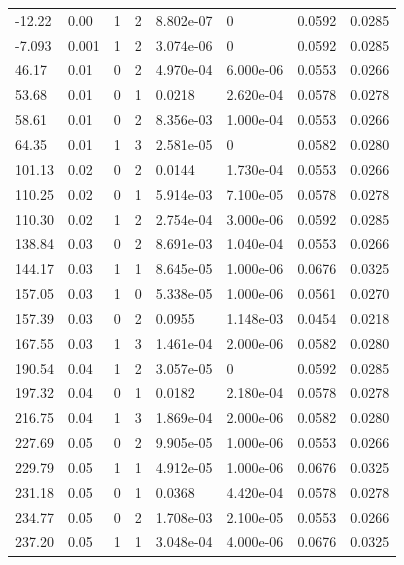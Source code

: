 \documentclass[preview]{standalone}
\begin{document}
{{\begin{tabular}{L{1.2cm}C{1.2cm} C{0.3cm}C{0.5cm} C{1.4cm}C{1.4cm} C{1.4cm}C{1.4cm}}
  -12.22  &  0.00  & 1     &  2 &  8.802e-07  & 0  & 0.0592 &  0.0285   \\ 
  -7.093  &  0.001  & 1     &  2 &  3.074e-06  & 0  & 0.0592 &  0.0285   \\ 
  46.17  &  0.01  & 0     &  2 &  4.970e-04  & 6.000e-06  & 0.0553 &  0.0266   \\ 
  53.68  &  0.01  & 0     &  1 &  0.0218  & 2.620e-04  & 0.0578 &  0.0278   \\ 
  58.61  &  0.01  & 0     &  2 &  8.356e-03  & 1.000e-04  & 0.0553 &  0.0266   \\ 
  64.35  &  0.01  & 1     &  3 &  2.581e-05  & 0  & 0.0582 &  0.0280   \\ 
  101.13  &  0.02  & 0     &  2 &  0.0144  & 1.730e-04  & 0.0553 &  0.0266   \\ 
  110.25  &  0.02  & 0     &  1 &  5.914e-03  & 7.100e-05  & 0.0578 &  0.0278   \\ 
  110.30  &  0.02  & 1     &  2 &  2.754e-04  & 3.000e-06  & 0.0592 &  0.0285   \\ 
  138.84  &  0.03  & 0     &  2 &  8.691e-03  & 1.040e-04  & 0.0553 &  0.0266   \\ 
  144.17  &  0.03  & 1     &  1 &  8.645e-05  & 1.000e-06  & 0.0676 &  0.0325   \\ 
  157.05  &  0.03  & 1     &  0 &  5.338e-05  & 1.000e-06  & 0.0561 &  0.0270   \\ 
  157.39  &  0.03  & 0     &  2 &  0.0955  & 1.148e-03  & 0.0454 &  0.0218   \\ 
  167.55  &  0.03  & 1     &  3 &  1.461e-04  & 2.000e-06  & 0.0582 &  0.0280   \\ 
  190.54  &  0.04  & 1     &  2 &  3.057e-05  & 0  & 0.0592 &  0.0285   \\ 
  197.32  &  0.04  & 0     &  1 &  0.0182  & 2.180e-04  & 0.0578 &  0.0278   \\ 
  216.75  &  0.04  & 1     &  3 &  1.869e-04  & 2.000e-06  & 0.0582 &  0.0280   \\ 
  227.69  &  0.05  & 0     &  2 &  9.905e-05  & 1.000e-06  & 0.0553 &  0.0266   \\ 
  229.79  &  0.05  & 1     &  1 &  4.912e-05  & 1.000e-06  & 0.0676 &  0.0325   \\ 
  231.18  &  0.05  & 0     &  1 &  0.0368  & 4.420e-04  & 0.0578 &  0.0278   \\ 
  234.77  &  0.05  & 0     &  2 &  1.708e-03  & 2.100e-05  & 0.0553 &  0.0266   \\ 
  237.20  &  0.05  & 1     &  1 &  3.048e-04  & 4.000e-06  & 0.0676 &  0.0325   \\ 

\end{tabular}}}
\end{document}
